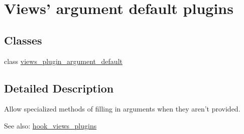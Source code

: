 \hypertarget{group__views__argument__default__plugins}{
\section{Views' argument default plugins}
\label{group__views__argument__default__plugins}
}
\subsection*{Classes}
\begin{CompactItemize}
\item 
class \hyperlink{classviews__plugin__argument__default}{views\_\-plugin\_\-argument\_\-default}
\end{CompactItemize}


\subsection{Detailed Description}
Allow specialized methods of filling in arguments when they aren't provided.

\begin{Desc}
\item[See also:]\hyperlink{group__views__hooks_g23f6e9972b2ed84fc54b7ff63f44477d}{hook\_\-views\_\-plugins} \end{Desc}
